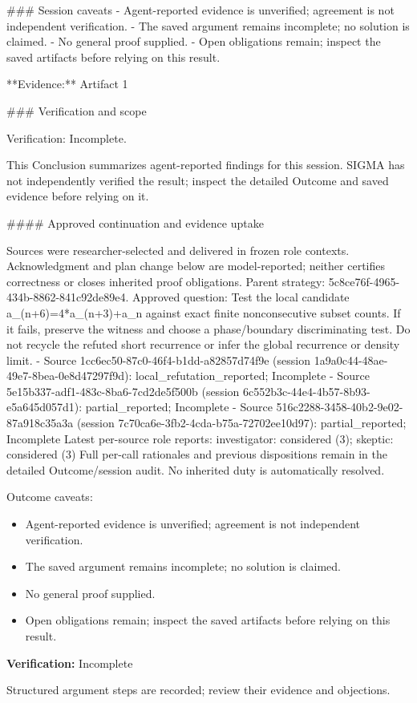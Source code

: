 \documentclass[11pt]{article}
\begin{document}
\#\#\# Session caveats
- Agent-reported evidence is unverified; agreement is not independent verification.
- The saved argument remains incomplete; no solution is claimed.
- No general proof supplied.
- Open obligations remain; inspect the saved artifacts before relying on this result.

**Evidence:** Artifact 1

\#\#\# Verification and scope

Verification: Incomplete.

This Conclusion summarizes agent-reported findings for this session. SIGMA has not independently verified the result; inspect the detailed Outcome and saved evidence before relying on it.

\#\#\#\# Approved continuation and evidence uptake

Sources were researcher-selected and delivered in frozen role contexts. Acknowledgment and plan change below are model-reported; neither certifies correctness or closes inherited proof obligations.
Parent strategy: 5c8ce76f-4965-434b-8862-841c92de89e4. Approved question: Test the local candidate a\_(n+6)=4*a\_(n+3)+a\_n against exact finite nonconsecutive subset counts. If it fails, preserve the witness and choose a phase/boundary discriminating test. Do not recycle the refuted short recurrence or infer the global recurrence or density limit.
- Source 1cc6ec50-87c0-46f4-b1dd-a82857d74f9e (session 1a9a0c44-48ae-49e7-8bea-0e8d47297f9d): local\_refutation\_reported; Incomplete
- Source 5e15b337-adf1-483c-8ba6-7cd2de5f500b (session 6c552b3c-44e4-4b57-8b93-e5a645d057d1): partial\_reported; Incomplete
- Source 516c2288-3458-40b2-9e02-87a918c35a3a (session 7c70ca6e-3fb2-4cda-b75a-72702ee10d97): partial\_reported; Incomplete
Latest per-source role reports: investigator: considered (3); skeptic: considered (3)
Full per-call rationales and previous dispositions remain in the detailed Outcome/session audit. No inherited duty is automatically resolved.\par
Outcome caveats:\par
\begin{itemize}
\item Agent-reported evidence is unverified; agreement is not independent verification.
\item The saved argument remains incomplete; no solution is claimed.
\item No general proof supplied.
\item Open obligations remain; inspect the saved artifacts before relying on this result.
\end{itemize}
\textbf{Verification:} Incomplete\par
Structured argument steps are recorded; review their evidence and objections.\par
\end{document}
